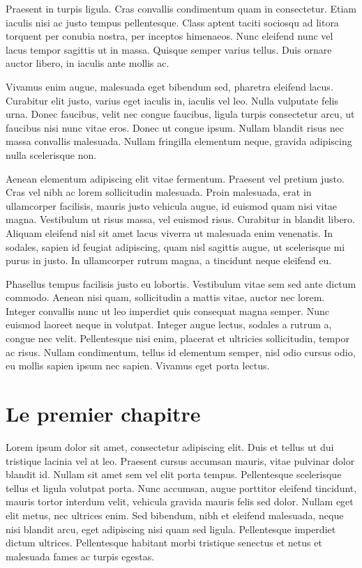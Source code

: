 \documentclass[a4paper,11pt]{scrbook}
\begin{document}
Praesent in turpis ligula. Cras convallis condimentum quam in consectetur. Etiam iaculis nisi ac justo tempus pellentesque. Class aptent taciti sociosqu ad litora torquent per conubia nostra, per inceptos himenaeos. Nunc eleifend nunc vel lacus tempor sagittis ut in massa. Quisque semper varius tellus. Duis ornare auctor libero, in iaculis ante mollis ac.

Vivamus enim augue, malesuada eget bibendum sed, pharetra eleifend lacus. Curabitur elit justo, varius eget iaculis in, iaculis vel leo. Nulla vulputate felis urna. Donec faucibus, velit nec congue faucibus, ligula turpis consectetur arcu, ut faucibus nisi nunc vitae eros. Donec ut congue ipsum. Nullam blandit risus nec massa convallis malesuada. Nullam fringilla elementum neque, gravida adipiscing nulla scelerisque non.

Aenean elementum adipiscing elit vitae fermentum. Praesent vel pretium justo. Cras vel nibh ac lorem sollicitudin malesuada. Proin malesuada, erat in ullamcorper facilisis, mauris justo vehicula augue, id euismod quam nisi vitae magna. Vestibulum ut risus massa, vel euismod risus. Curabitur in blandit libero. Aliquam eleifend nisl sit amet lacus viverra ut malesuada enim venenatis. In sodales, sapien id feugiat adipiscing, quam nisl sagittis augue, ut scelerisque mi purus in justo. In ullamcorper rutrum magna, a tincidunt neque eleifend eu.

Phasellus tempus facilisis justo eu lobortis. Vestibulum vitae sem sed ante dictum commodo. Aenean nisi quam, sollicitudin a mattis vitae, auctor nec lorem. Integer convallis nunc ut leo imperdiet quis consequat magna semper. Nunc euismod laoreet neque in volutpat. Integer augue lectus, sodales a rutrum a, congue nec velit. Pellentesque nisi enim, placerat et ultricies sollicitudin, tempor ac risus. Nullam condimentum, tellus id elementum semper, nisl odio cursus odio, eu mollis sapien ipsum nec sapien. Vivamus eget porta lectus.

\chapter{Le premier chapitre }

Lorem ipsum dolor sit amet, consectetur adipiscing elit. Duis et tellus ut dui tristique lacinia vel at leo. Praesent cursus accumsan mauris, vitae pulvinar dolor blandit id. Nullam sit amet sem vel elit porta tempus. Pellentesque scelerisque tellus et ligula volutpat porta. Nunc accumsan, augue porttitor eleifend tincidunt, mauris tortor interdum velit, vehicula gravida mauris felis sed dolor. Nullam eget elit metus, nec ultrices enim. Sed bibendum, nibh et eleifend malesuada, neque nisi blandit arcu, eget adipiscing nisi quam sed ligula. Pellentesque imperdiet dictum ultrices. Pellentesque habitant morbi tristique senectus et netus et malesuada fames ac turpis egestas.
\end{document}
